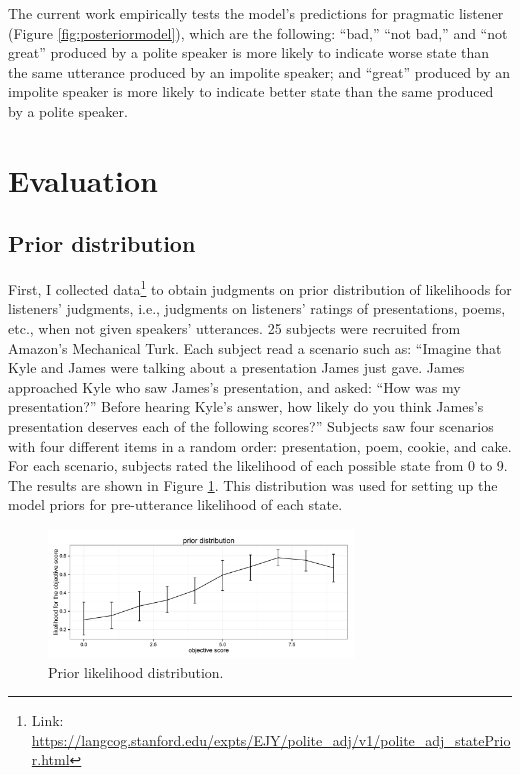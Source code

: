 \documentclass[10pt,letterpaper]{article}
\begin{document}
The current work empirically tests the model's predictions for pragmatic listener (Figure \ref{fig:posteriormodel}), which are the following: ``bad,'' ``not bad,'' and ``not great'' produced by a polite speaker is more likely to indicate worse state than the same utterance produced by an impolite speaker; and ``great'' produced by an impolite speaker is more likely to indicate better state than the same produced by a polite speaker. 

\section{Evaluation}

\subsection{Prior distribution}

First, I collected data\footnote{Link: \url{https://langcog.stanford.edu/expts/EJY/polite\_adj/v1/polite\_adj\_statePrior.html}} to obtain judgments on prior distribution of likelihoods for listeners' judgments, i.e., judgments on listeners' ratings of presentations, poems, etc., when not given speakers' utterances. 25 subjects were recruited from Amazon's Mechanical Turk. Each subject read a scenario such as: ``Imagine that Kyle and James were talking about a presentation James just gave. James approached Kyle who saw James's presentation, and asked: ``How was my presentation?'' Before hearing Kyle's answer, how likely do you think James's presentation deserves each of the following scores?'' Subjects saw four scenarios with four different items in a random order: presentation, poem, cookie, and cake.  For each scenario, subjects rated the likelihood of each possible state from 0 to 9. The results are shown in Figure \ref{fig:prior}. This distribution was used for setting up the model priors for pre-utterance likelihood of each state. 

\begin{figure}
\begin{centering} 
\includegraphics[width=3.2in]{figures/v1_statePrior.pdf}
\caption{\label{fig:prior} Prior likelihood distribution.}
\end{centering} 
\end{figure}
\end{document}

